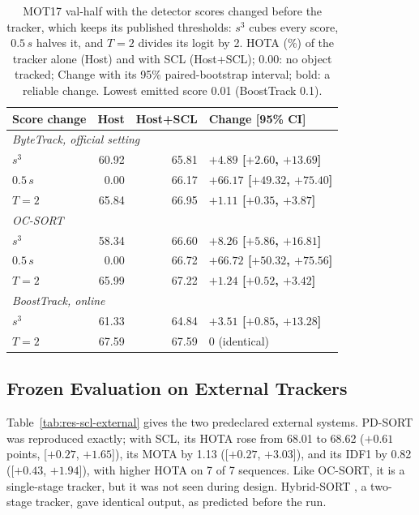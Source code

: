 \begin{table}[tbp]
\centering
\caption{MOT17 val-half with the detector scores changed before the tracker, which keeps its published thresholds: $s^3$ cubes every score, $0.5\,s$ halves it, and $T=2$ divides its logit by 2. HOTA (\%) of the tracker alone (Host) and with SCL (Host+SCL); 0.00: no object tracked; Change with its 95\% paired-bootstrap interval; bold: a reliable change. Lowest emitted score 0.01 (BoostTrack 0.1).}
\label{tab:res-scl-shift}
\begin{tabular}{lrrl}
\toprule
Score change & Host & Host+SCL & Change [95\% CI]\\
\midrule
\multicolumn{4}{l}{\textit{ByteTrack, official setting} \cite{zhang2022bytetrack}}\\
\quad $s^3$ & 60.92 & 65.81 & \textbf{$+4.89$ [$+2.60$, $+13.69$]}\\
\quad $0.5\,s$ & 0.00 & 66.17 & \textbf{$+66.17$ [$+49.32$, $+75.40$]}\\
\quad $T=2$ & 65.84 & 66.95 & \textbf{$+1.11$ [$+0.35$, $+3.87$]}\\
\multicolumn{4}{l}{\textit{OC-SORT} \cite{cao2023ocsort}}\\
\quad $s^3$ & 58.34 & 66.60 & \textbf{$+8.26$ [$+5.86$, $+16.81$]}\\
\quad $0.5\,s$ & 0.00 & 66.72 & \textbf{$+66.72$ [$+50.32$, $+75.56$]}\\
\quad $T=2$ & 65.99 & 67.22 & \textbf{$+1.24$ [$+0.52$, $+3.42$]}\\
\multicolumn{4}{l}{\textit{BoostTrack, online} \cite{stanojevic2024boosttrack}}\\
\quad $s^3$ & 61.33 & 64.84 & \textbf{$+3.51$ [$+0.85$, $+13.28$]}\\
\quad $T=2$ & 67.59 & 67.59 & 0 (identical)\\
\bottomrule
\end{tabular}
\end{table}

\subsection{Frozen Evaluation on External Trackers}\label{sec:res-scl-external}
Table~\ref{tab:res-scl-external} gives the two predeclared external systems. PD-SORT \cite{wang2025pdsort} was reproduced exactly; with SCL, its HOTA rose from 68.01 to 68.62 ($+0.61$ points, [$+0.27$, $+1.65$]), its MOTA by 1.13 ([$+0.27$, $+3.03$]), and its IDF1 by 0.82 ([$+0.43$, $+1.94$]), with higher HOTA on 7 of 7 sequences. Like OC-SORT, it is a single-stage tracker, but it was not seen during design. Hybrid-SORT \cite{yang2024hybridsort}, a two-stage tracker, gave identical output, as predicted before the run.

